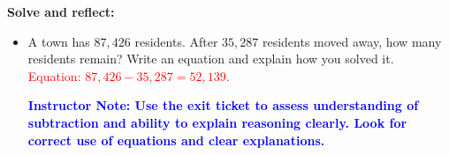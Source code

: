 \documentclass[27.11148pt]{article}
\newcommand{\solution}[1]{\textcolor{red}{#1}}
\newcommand{\note}[1]{\textcolor{blue}{\textbf{Instructor Note: #1}}}
\begin{document}
\begin{tcolorbox}[colframe=black!60, colback=white, 
coltitle=black, colbacktitle=black!15, fonttitle=\bfseries\Large, 
title=Exit Ticket, halign title=center, left=10pt, right=10pt, top=10pt, bottom=15pt]
\textbf{Solve and reflect:}
\begin{itemize}
    \item A town has \( 87,426 \) residents. After \( 35,287 \) residents moved away, how many residents remain? Write an equation and explain how you solved it.\\
    \solution{Equation: \( 87,426 - 35,287 = 52,139 \).}

    \note{Use the exit ticket to assess understanding of subtraction and ability to explain reasoning clearly. Look for correct use of equations and clear explanations.}
\end{itemize}
\end{tcolorbox}
\end{document}
